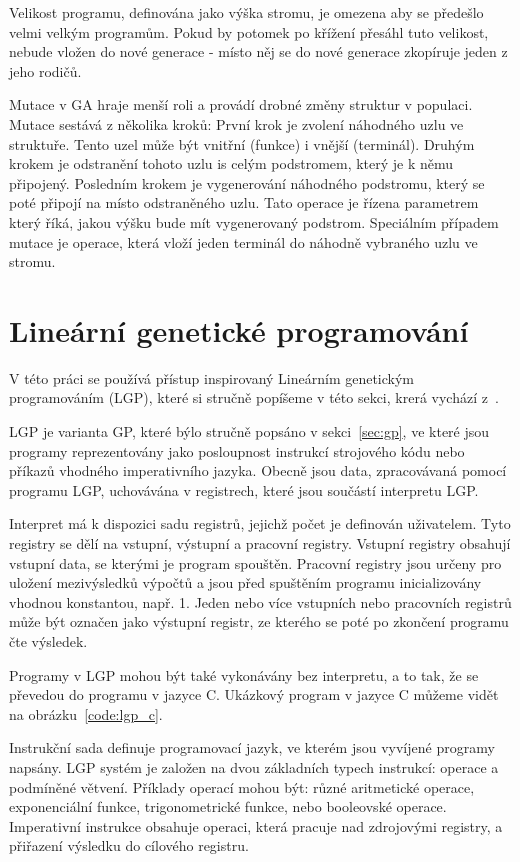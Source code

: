 Velikost programu, definována jako výška stromu, je omezena aby se předešlo velmi velkým programům.
Pokud by potomek po křížení přesáhl tuto velikost, nebude vložen do nové generace - místo něj se do nové generace zkopíruje jeden z jeho rodičů.

Mutace v GA hraje menší roli a provádí drobné změny struktur v populaci.
Mutace sestává z několika kroků:
První krok je zvolení náhodného uzlu ve struktuře.
Tento uzel může být vnitřní (funkce) i vnější (terminál).
Druhým krokem je odstranění tohoto uzlu is celým podstromem, který je k němu připojený.
Posledním krokem je vygenerování náhodného podstromu, který se poté připojí na místo odstraněného uzlu.
Tato operace je řízena parametrem který říká, jakou výšku bude mít vygenerovaný podstrom.
Speciálním případem mutace je operace, která vloží jeden terminál do náhodně vybraného uzlu ve stromu.

\section{Lineární genetické programování}
\label{sec:lgp}

V této práci se používá přístup inspirovaný Lineárním genetickým programováním (LGP), které si stručně popíšeme v této sekci, krerá vychází z~\cite{Brameier2010}.

LGP je varianta GP, které býlo stručně popsáno v sekci~\ref{sec:gp}, ve které jsou programy reprezentovány jako posloupnost instrukcí strojového kódu nebo příkazů vhodného imperativního jazyka.
Obecně jsou data, zpracovávaná pomocí programu LGP, uchovávána v registrech, které jsou součástí interpretu LGP.

Interpret má k dispozici sadu registrů, jejichž počet je definován uživatelem.
Tyto registry se dělí na vstupní, výstupní a pracovní registry.
Vstupní registry obsahují vstupní data, se kterými je program spouštěn.
Pracovní registry jsou určeny pro uložení mezivýsledků výpočtů a jsou před spuštěním programu inicializovány vhodnou konstantou, např. 1.
Jeden nebo více vstupních nebo pracovních registrů může být označen jako výstupní registr, ze kterého se poté po zkončení programu čte výsledek.

Programy v LGP mohou být také vykonávány bez interpretu, a to tak, že se převedou do programu v jazyce C.
Ukázkový program v jazyce C můžeme vidět na obrázku~\ref{code:lgp_c}.

Instrukční sada definuje programovací jazyk, ve kterém jsou vyvíjené programy napsány.
LGP systém je založen na dvou základních typech instrukcí: operace a podmíněné větvení.
Příklady operací mohou být: různé aritmetické operace, exponenciální funkce, trigonometrické funkce, nebo booleovské operace.
Imperativní instrukce obsahuje operaci, která pracuje nad zdrojovými registry, a přiřazení výsledku do cílového registru.

